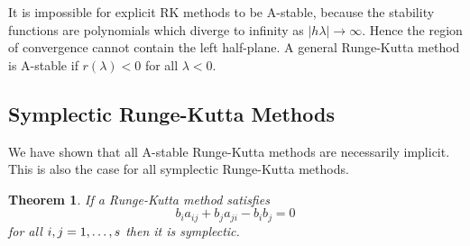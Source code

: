\documentclass{report}
\newtheorem{theorem}{Theorem}[chapter]
\theoremstyle{exampstyle} \newtheorem{example}[theorem]{Example}
\theoremstyle{exampstyle} \newtheorem{remark}[theorem]{Remark}
\theoremstyle{exampstyle} \newtheorem{definition}[theorem]{Definition}
\theoremstyle{exampstyle} \newtheorem{lemma}[theorem]{Lemma}
\theoremstyle{exampstyle} \newtheorem{proposition}[theorem]{Proposition}
\begin{document}
It is impossible for explicit RK methods to be A-stable, because the stability functions are polynomials which diverge to infinity as $|h\lambda| \rightarrow \infty$.
Hence the region of convergence cannot contain the left half-plane.
A general Runge-Kutta method is A-stable if $r(\lambda) < 0$ for all $\lambda < 0$.

\subsection{Symplectic Runge-Kutta Methods}

We have shown that all A-stable Runge-Kutta methods are necessarily implicit.
This is also the case for all symplectic Runge-Kutta methods.

\begin{theorem}
\label{thm:symrk}
If a Runge-Kutta method satisfies
\begin{equation}
	b_i a_{ij} + b_j a_{ji} - b_i b_j = 0
\end{equation}
for all $i, j = 1, \mathellipsis, s$ then it is symplectic.
\end{theorem}
\end{document}
